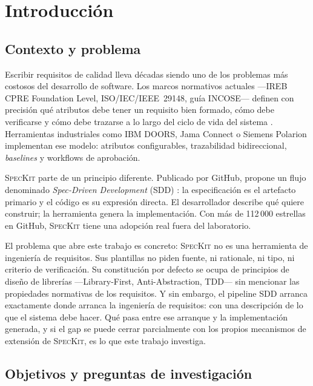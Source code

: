 \section{Introducci\'on}
\label{sec:introduccion}

\subsection{Contexto y problema}

Escribir requisitos de calidad lleva d\'ecadas siendo uno de los problemas m\'as costosos del desarrollo de software. Los marcos normativos actuales ---IREB CPRE Foundation Level, ISO/IEC/IEEE~29148, gu\'ia INCOSE--- definen con precisi\'on qu\'e atributos debe tener un requisito bien formado, c\'omo debe verificarse y c\'omo debe trazarse a lo largo del ciclo de vida del sistema \cite{cpre,iso29148,incose}. Herramientas industriales como IBM DOORS, Jama Connect o Siemens Polarion implementan ese modelo: atributos configurables, trazabilidad bidireccional, \emph{baselines} y workflows de aprobaci\'on.

\textsc{SpecKit} \cite{speckit_repo} parte de un principio diferente. Publicado por GitHub, propone un flujo denominado \emph{Spec-Driven Development} (SDD) \cite{speckit_sdd}: la especificaci\'on es el artefacto primario y el c\'odigo es su expresi\'on directa. El desarrollador describe qu\'e quiere construir; la herramienta genera la implementaci\'on. Con m\'as de 112\,000 estrellas en GitHub, \textsc{SpecKit} tiene una adopci\'on real fuera del laboratorio.

El problema que abre este trabajo es concreto: \textsc{SpecKit} no es una herramienta de ingenier\'ia de requisitos. Sus plantillas no piden fuente, ni rationale, ni tipo, ni criterio de verificaci\'on. Su constituci\'on por defecto se ocupa de principios de dise\~no de librer\'ias ---Library-First, Anti-Abstraction, TDD--- sin mencionar las propiedades normativas de los requisitos. Y sin embargo, el pipeline SDD arranca exactamente donde arranca la ingenier\'ia de requisitos: con una descripci\'on de lo que el sistema debe hacer. Qu\'e pasa entre ese arranque y la implementaci\'on generada, y si el gap se puede cerrar parcialmente con los propios mecanismos de extensi\'on de \textsc{SpecKit}, es lo que este trabajo investiga.

\subsection{Objetivos y preguntas de investigaci\'on}

